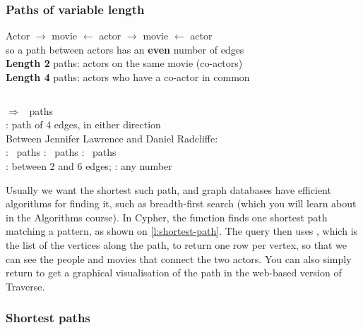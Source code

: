 \begin{frame}
    \label{s:var-length}
    \frametitle{Paths of variable length}
    Actor $\rightarrow$ movie $\leftarrow$ actor $\rightarrow$ movie $\leftarrow$ actor\\
    so a path between actors has an \textbf{even} number of edges\\[0.5em]
    \textbf{Length 2} paths: actors on the same movie (co-actors)\\[0.5em]
    \textbf{Length 4} paths: actors who have a co-actor in common\pause
    \vspace{0.5em}
    \inputminted[fontsize=\footnotesize]{cypher}{code/graph-varlength.cypher}
    \vspace{0.3em}
    $\Rightarrow$ \graphpathsfour\ paths\\[0.8em]
    \code{[:ACTED_IN*4]}: path of 4  edges, in either direction\\[0.3em]\pause
    Between Jennifer Lawrence and Daniel Radcliffe:\\\hspace*{1em}
    : \graphpathstwo\ paths\quad
    : \graphpathsfour\ paths\quad
    : \graphpathssix\ paths\\[0.3em]
    : between 2 and 6 edges; \code{*}: any number
\end{frame}
\label{l:var-length}

Usually we want the shortest such path, and graph databases have efficient algorithms for finding it, such as breadth-first search (which you will learn about in the Algorithms course).
In Cypher, the  function finds one shortest path matching a pattern, as shown on \autoref{l:shortest-path}.
The query then uses , which is the list of the vertices along the path, to return one row per vertex, so that we can see the people and movies that connect the two actors.
You can also simply return  to get a graphical visualisation of the path in the web-based version of Traverse.

\begin{frame}
    \label{s:shortest-path}
    \frametitle{Shortest paths}
    \inputminted[fontsize=\footnotesize]{cypher}{code/graph-shortest.cypher}
    \vspace{0.3em}
    {\footnotesize}
\end{frame}
\label{l:shortest-path}

